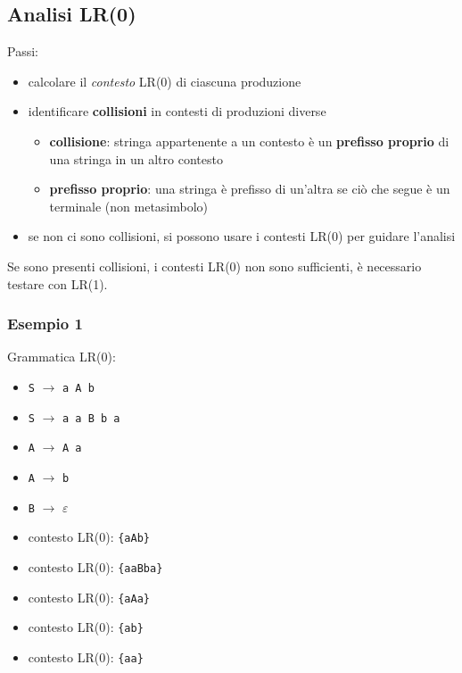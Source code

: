 \subsection{Analisi LR(0)}
Passi:
\begin{itemize}
    \item calcolare il \textit{contesto} LR(0) di ciascuna produzione
    \item identificare \textbf{collisioni} in contesti di produzioni diverse
    \begin{itemize}
        \item \textbf{collisione}: stringa appartenente a un contesto è un \textbf{prefisso proprio} di una stringa in un altro contesto
        \item \textbf{prefisso proprio}: una stringa è prefisso di un'altra se ciò che segue è un terminale (non metasimbolo)
    \end{itemize}
    \item se non ci sono collisioni, si possono usare i contesti LR(0) per guidare l'analisi
\end{itemize}

Se sono presenti collisioni, i contesti LR(0) non sono sufficienti, è necessario testare con LR(1).
\subsubsection{Esempio 1}
Grammatica LR(0):
\begin{multicols}{2}
    \begin{itemize}
        \item \texttt{S} $\rightarrow$ \texttt{a A b}
        \item \texttt{S} $\rightarrow$ \texttt{a a B b a}
        \item \texttt{A} $\rightarrow$ \texttt{A a}
        \item \texttt{A} $\rightarrow$ \texttt{b}
        \item \texttt{B} $\rightarrow$ $\varepsilon$
    \end{itemize}
    \columnbreak
    \begin{itemize}
        \item[] contesto LR(0): \texttt{\{aAb\}}
        \item[] contesto LR(0): \texttt{\{aaBba\}}
        \item[] contesto LR(0): \texttt{\{aAa\}}
        \item[] contesto LR(0): \texttt{\{ab\}}
        \item[] contesto LR(0): \texttt{\{aa\}}
    \end{itemize}
\end{multicols}
\setlist{}

